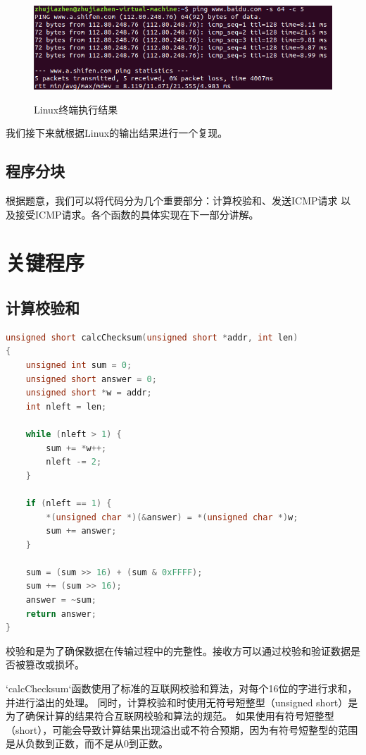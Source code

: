 \documentclass[12pt]{ctexart}
\begin{document}
    \begin{figure}[H]
        \centering
        \includegraphics[width=5in]{figures/linux.png}
        \label{li}
        \caption{Linux终端执行结果}
    \end{figure}

    我们接下来就根据Linux的输出结果进行一个复现。

    \subsection{程序分块}

    根据题意，我们可以将代码分为几个重要部分：计算校验和、发送ICMP请求
    以及接受ICMP请求。各个函数的具体实现在下一部分讲解。

    \section{关键程序}
    \subsection{计算校验和}

    \begin{flushleft}
    \begin{lstlisting}[language = C]
unsigned short calcChecksum(unsigned short *addr, int len)
{
    unsigned int sum = 0;
    unsigned short answer = 0;
    unsigned short *w = addr;
    int nleft = len;

    while (nleft > 1) {
        sum += *w++;
        nleft -= 2;
    }

    if (nleft == 1) {
        *(unsigned char *)(&answer) = *(unsigned char *)w;
        sum += answer;
    }

    sum = (sum >> 16) + (sum & 0xFFFF);
    sum += (sum >> 16);
    answer = ~sum;
    return answer;
}
    \end{lstlisting}
\end{flushleft}

    校验和是为了确保数据在传输过程中的完整性。接收方可以通过校验和验证数据是否被篡改或损坏。

    `calcChecksum`函数使用了标准的互联网校验和算法，对每个16位的字进行求和，并进行溢出的处理。
    同时，计算校验和时使用无符号短整型（unsigned short）是为了确保计算的结果符合互联网校验和算法的规范。
    如果使用有符号短整型（short），可能会导致计算结果出现溢出或不符合预期，因为有符号短整型的范围是从负数到正数，而不是从0到正数。
\end{document}
